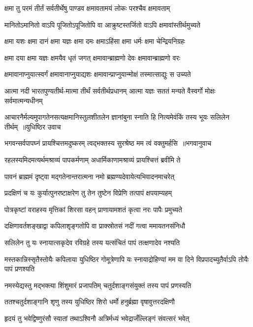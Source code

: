 \twolineshloka
{क्षमा तु परमं तीर्तं सर्वतीर्थेषु पाण्डव}
{क्षमावतामयं लोकः परश्चैव क्षमावताम्}


\twolineshloka
{मानितोऽमानितो वाऽपि पूजितोऽपूजितोपि वा}
{आक्रुष्टस्तर्जितो वाऽपि क्षमावांस्तीर्थमुच्यते}


\twolineshloka
{क्षमा यशः क्षमा दानं क्षमा यज्ञः क्षमा दमः}
{क्षमाऽहिंसा क्षमा धर्मः क्षमा चेन्द्रियनिग्रहः}


\twolineshloka
{क्षमा दया क्षमा यज्ञः क्षमयैव धृतं जगत्}
{क्षमावान्ब्राह्मणो देवः क्षमावान्ब्राह्मणो वरः}


\twolineshloka
{क्षमावानाप्नुयात्स्वर्गं क्षमावानाप्नुयाद्यशः}
{क्षमावान्प्राप्नुयान्मोक्षं तस्मात्साद्युः स उच्यते}


\twolineshloka
{आत्मा नदी भारतपुण्यतीर्थ-मात्मा तीर्थं सर्वतीर्थप्रधानम्}
{आत्मा यज्ञः सततं मन्यते वैस्वर्गो मोक्षः सर्वमात्मन्यधीनम्}


\threelineshloka
{आचारनैर्मल्यमुपागतेनसत्यक्षमानिस्तुलशीतलेन}
{ज्ञानांबुना स्नाति हि नित्यमेवंकिं तस्य भूयः सलिलेन तीर्थम् ॥युधिष्ठिर उवाच}
{}


\threelineshloka
{भगवन्सर्वपापघ्नं प्रायश्चित्तमदुष्करम्}
{त्वद्भक्तस्य सुरश्रेष्ठ मम त्वं वक्तुमर्हसि ॥भगवानुवाच}
{}


\twolineshloka
{रहलस्यमिदमत्यर्थमश्राव्यं पापकर्मणाम्}
{अधार्मिकाणामश्राव्यं प्रायश्चित्तं ब्रवीमि ते}


\twolineshloka
{पावनं ब्राह्ममं दृष्ट्वा मद्गतेनान्तरात्मना}
{नमो ब्रह्मण्यदेवायेत्यभिवादनमाचरेत्}


\twolineshloka
{प्रदक्षिणं च यः कुर्यात्पुनरष्टाक्षरेण तु}
{तेन तुष्टेन विप्रेणि तत्पापं क्षपयाम्यहम्}


\twolineshloka
{पोत्रकृष्टां वराहस्य मृत्तिकां शिरसा वहन्}
{प्राणायामशतं कृत्वा नरः पापैः प्रमुच्यते}


\twolineshloka
{दक्षिणावर्तशङ्खाद्वा कपिलाशृङ्गतोपि वा}
{प्राक्स्रोतसं नदीं गत्वा ममायतनसंनिधौ}


\twolineshloka
{सलिलेन तु यः स्नायात्सकृदेव रविग्रहे}
{तस्य यत्संचितं पापं तत्क्षणादेव नश्यति}


\threelineshloka
{मस्तकान्निस्सृतैस्तोयैः कपिलाया युधिष्ठिर}
{गोमूत्रेणापि यः स्नायाद्रोहिण्यां मम वा दिने}
{विप्रपादच्युतैर्वाऽपि तोयैः पापं प्रणश्यति}


\twolineshloka
{नमस्येद्यस्तु मद्भक्त्या शिंशुमारं प्रजापतिम्}
{चतुर्दशाङ्गसंयुक्तं तस्य पापं प्रणस्यति}


\twolineshloka
{ततश्चतुर्दशाङ्गानि शृणु तस्य युधिष्ठिर}
{शिरो धर्मो हनुर्ब्रह्मा वृषावुत्तरदक्षिणौ}


\twolineshloka
{हृदयं तु भवेद्विष्णुरंसौ स्यातां तथाऽश्विनौ}
{अत्रिर्मध्यं भवेद्राजँल्लिङ्गं संवत्सरं भवेत्}


